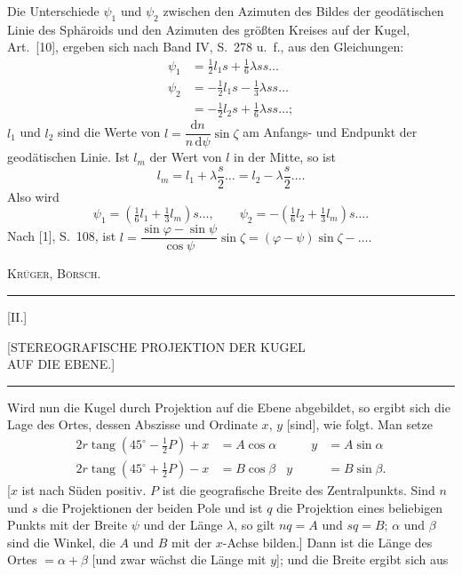 Die Unterschiede $\psi_1$ und $\psi_2$ zwischen den Azimuten des Bildes der geodätischen Linie des Sphäroids und den Azimuten des größten Kreises auf der Kugel, Art.~[10], ergeben sich nach Band IV, S.~278 u.~f., aus den Gleichungen:
\[
\begin{aligned}
\psi_1&=\tfrac12l_1s+\tfrac16\lambda ss\ldots\\
\psi_2&=-\tfrac12l_1s-\tfrac13\lambda ss\ldots\\
&=-\tfrac12l_2s+\tfrac16\lambda ss\ldots;
\end{aligned}
\]
$l_1$ und $l_2$ sind die Werte von $l=\dfrac{\mathrm dn}{n\,\mathrm d\psi}\sin\zeta$ am Anfangs- und Endpunkt der geodätischen Linie. Ist $l_m$ der Wert von $l$ in der Mitte, so ist
\[
l_m=l_1+\lambda\frac s2\ldots=l_2-\lambda\frac s2\ldots.
\]
Also wird
\[
\psi_1=(\tfrac16l_1+\tfrac13l_m)s\ldots,\qquad\psi_2=-(\tfrac16l_2+\tfrac13l_m)s\ldots.
\]
Nach [1], S.~108, ist $l=\dfrac{\sin\varphi-\sin\psi}{\cos\psi}\sin\zeta=(\varphi-\psi)\sin\zeta-\ldots.$\par
\noindent\hfill\textsc{Krüger, Börsch.}\par
\par\endgroup
\vfill\begin{center}\rule{.24\textwidth}{.4pt}\end{center}
\clearpage
\begin{center}
[II.]\par\bigskip
{\large [STEREOGRAFISCHE PROJEKTION DER KUGEL\\AUF DIE EBENE.]}\par\bigskip
\rule{.1\textwidth}{.4pt}\par\bigskip
[1.]
\end{center}
Wird nun die Kugel durch  Projektion auf die Ebene abgebildet, so ergibt sich die Lage des Ortes, dessen Abszisse und Ordinate $x$, $y$ [sind], wie folgt. Man setze
\[
\begin{aligned}
2r\operatorname{tang}(45^\circ-\tfrac12P)+x&=A\cos\alpha&\qquad y&=A\sin\alpha\\
2r\operatorname{tang}(45^\circ+\tfrac12P)-x&=B\cos\beta&y&=B\sin\beta.
\end{aligned}
\]
[$x$ ist nach Süden positiv. $P$ ist die geografische Breite des Zentralpunkts. Sind $n$ und $s$ die Projektionen der beiden Pole und ist $q$ die Projektion eines beliebigen Punkts mit der Breite $\psi$ und der Länge $\lambda$, so gilt $nq=A$ und $sq=B$; $\alpha$ und $\beta$ sind die Winkel, die $A$ und $B$ mit der $x$-Achse bilden.] Dann ist die Länge des Ortes $=\alpha+\beta$ [und zwar wächst die Länge mit $y$]; und die Breite ergibt sich aus
